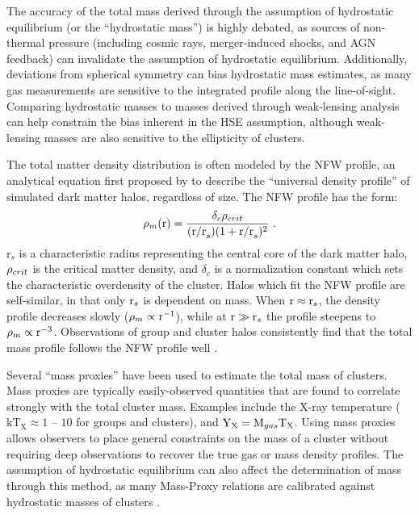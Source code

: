 The accuracy of the total mass derived through the assumption of
hydrostatic equilibrium (or the ``hydrostatic mass'') is highly
debated, as sources of non-thermal pressure (including cosmic rays,
merger-induced shocks, and AGN feedback) can invalidate the assumption
of hydrostatic equilibrium. Additionally, deviations from spherical
symmetry can bias hydrostatic mass estimates, as many gas measurements
are sensitive to the integrated profile along the
line-of-sight. Comparing hydrostatic masses to masses derived through
weak-lensing analysis can help constrain the bias inherent in the HSE
assumption, although weak-lensing masses are also sensitive to the
ellipticity of clusters.

The total matter density distribution is often modeled by the NFW
profile, an analytical equation first proposed by \citet{Navarro1996}
to describe the ``universal density profile'' of simulated dark matter
halos, regardless of size. The NFW profile has the form:
\begin{equation}
\rho_m(\textrm{r}) = \frac{\delta_c\rho_{crit}}{(\textrm{r/r}_s)(1 + \textrm{r/r}_s)^2}~.\nonumber
\end{equation}
r$_s$ is a characteristic radius representing the central core of the
dark matter halo, $\rho_{crit}$ is the critical matter density, and
$\delta_c$ is a normalization constant which sets the characteristic
overdensity of the cluster. Halos which fit the NFW profile are
self-similar, in that only $\textrm{r}_s$ is dependent on mass. When
$\textrm{r} \approx \textrm{r}_s$, the density profile decreases slowly
($\rho_m \propto \textrm{r}^{-1}$), while at $\textrm{r} \gg \textrm{r}_s$ the
profile steepens to $\rho_m \propto \textrm{r}^{-3}$. Observations of
group and cluster halos consistently find that the total mass profile
follows the NFW profile well
.

Several ``mass proxies'' have been used to estimate the total mass of
clusters. Mass proxies are typically easily-observed quantities that
are found to correlate strongly with the total cluster mass. Examples
include the X-ray temperature ($\textrm{kT}_\textrm{X}\approx1$ -- $10$ \keV{}
for groups and clusters), and $\textrm{Y}_{\textrm{X}} =
\textrm{M}_{gas}\textrm{T}_\textrm{X}$. Using mass proxies allows observers
to place general constraints on the mass of a cluster without
requiring deep observations to recover the true gas or mass density
profiles. The assumption of hydrostatic equilibrium can also affect
the determination of mass through this method, as many Mass-Proxy
relations are calibrated against hydrostatic masses of clusters
.

